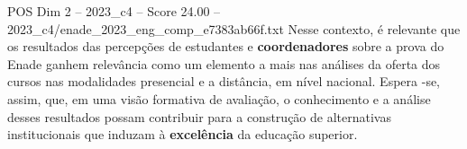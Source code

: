 \begin{textsample}{POS Dim 2 – 2023\_c4 – Score 24.00 – 2023\_c4/enade\_2023\_eng\_comp\_e7383ab66f.txt}
Nesse contexto, é relevante que os resultados das percepções de estudantes e \textbf{coordenadores} sobre a prova do Enade ganhem relevância como um elemento a mais nas análises da oferta dos cursos nas modalidades presencial e a distância, em nível nacional.
Espera -se, assim, que, em uma visão formativa de avaliação, o conhecimento e a análise desses resultados possam contribuir para a construção de alternativas institucionais que induzam à \textbf{excelência} da educação superior.

\end{textsample}
